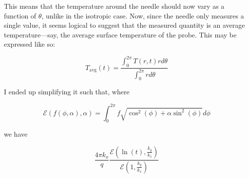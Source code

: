 \documentclass[10pt, letterpaper]{article}
\begin{document}
This means that the temperature around the needle should now vary as a function of \(\theta\), unlike in the isotropic case. Now, since the needle only measures a single value, it seems logical to suggest that the measured quantity is an average temperature---say, the average surface temperature of the probe.  This may be expressed like so:

\begin{equation}
T_{\textrm{avg}}(t) = \frac{ \int_0^{2\pi} T(r,t) rd\theta }
                           { \int_0^{2\pi} rd\theta}
\end{equation}

I ended up simplifying it such that, where

\begin{equation}
\mathcal{E}(f(\phi, \alpha), \alpha) = \int_0^{2\pi} f\sqrt{\cos^2(\phi) + \alpha\sin^2(\phi)} d\phi
\end{equation}

we have

\begin{equation}
\frac{4\pi k_x}{q} \frac{\mathcal{E}(\ln(t), \frac{k_y}{k_x})}{\mathcal{E}(1, \frac{k_y}{k_x})}
\end{equation}
\end{document}
